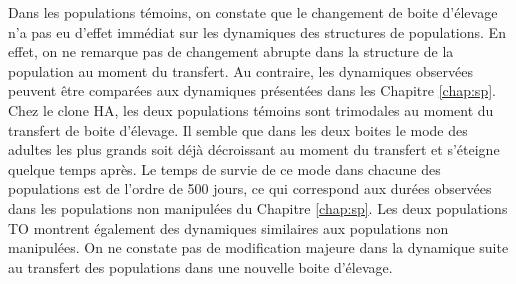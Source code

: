 Dans les populations témoins, on constate que le changement de boite d'élevage
n'a pas eu d'effet immédiat sur les dynamiques des structures de populations. En
effet, on ne remarque pas de changement abrupte dans la structure de la
population au moment du transfert. Au contraire, les dynamiques observées
peuvent être comparées aux dynamiques présentées dans les Chapitre
\ref{chap:sp}. Chez le clone HA, les deux populations témoins sont trimodales au
moment du transfert de boite d'élevage. Il semble que dans les deux boites le
mode des adultes les plus grands soit déjà décroissant au moment du transfert et
s'éteigne quelque temps après. Le temps de survie de ce mode dans chacune des
populations est de l'ordre de 500 jours, ce qui correspond aux durées observées
dans les populations non manipulées du Chapitre \ref{chap:sp}. Les deux
populations TO montrent également des dynamiques similaires aux populations non
manipulées. On ne constate pas de modification majeure dans la dynamique suite
au transfert des populations dans une nouvelle boite d'élevage. 

